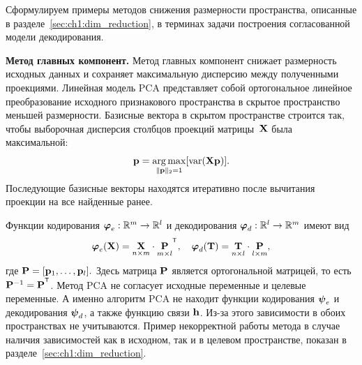 Сформулируем примеры методов снижения размерности пространства, описанные в разделе~\ref{sec:ch1:dim_reduction}, в терминах задачи построения согласованной модели декодирования.

\textbf{Метод главных компонент.} 
Метод главных компонент снижает размерность исходных данных и сохраняет максимальную дисперсию между полученными проекциями. 
Линейная модель PCA представляет собой ортогональное линейное преобразование исходного признакового пространства в скрытое пространство меньшей размерности. 
Базисные вектора в скрытом пространстве строится так, чтобы выборочная дисперсия столбцов проекций матрицы~$\mathbf{X}$ была максимальной:
\begin{equation}
	\mathbf{p} = \mathop{\arg \max}\limits_{\|\mathbf{p}\|_{2} = 1} [\text{var}(\mathbf{X} \textbf{p})].
	\label{eq:PCA}
\end{equation}
Последующие базисные векторы находятся итеративно после вычитания проекции на все найденные ранее.

Функции кодирования $\boldsymbol{\varphi}_e: \mathbb{R}^m \to \mathbb{R}^l$ и декодирования $\boldsymbol{\varphi}_d: \mathbb{R}^l \to \mathbb{R}^m$ имеют вид
\begin{equation}
	\bphi_e(\bX) =  \underset{n \times m}\bX \cdot \underset{m \times l}\bP^{\T}, \quad	\bphi_d(\bT) =  \underset{n \times l}\bT \cdot \underset{l \times m}\bP,
	\label{eq:PCA2}
\end{equation}
где $\mathbf{P} = [\mathbf{p}_1, \dots, \mathbf{p}_l].$ Здесь матрица $\mathbf{P}$ является ортогональной матрицей, то есть $\bP^{-1} = \bP^{\T}$.
Метод PCA не согласует исходные переменные и целевые переменные. 
А именно алгоритм PCA не находит функции кодирования $\boldsymbol{\psi}_e$ и декодирования $\boldsymbol{\psi}_d$, а также функцию связи $\mathbf{h}$. 
Из-за этого зависимости в обоих пространствах не учитываются.
Пример некорректной работы  метода в случае наличия зависимостей как в исходном, так и в целевом пространстве, показан в разделе~\ref{sec:ch1:dim_reduction}.

